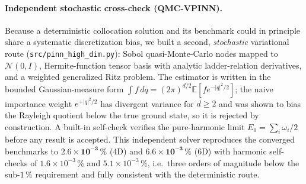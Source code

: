 \documentclass[11pt,a4paper]{article}
\begin{document}
\paragraph{Independent stochastic cross-check (QMC-VPINN).}
Because a deterministic collocation solution and its benchmark could in principle share
a systematic discretization bias, we built a second, \emph{stochastic} variational route
(\texttt{src/pinn\_high\_dim.py}): Sobol quasi-Monte-Carlo nodes mapped to $\mathcal{N}(0, I)$,
Hermite-function tensor basis with analytic ladder-relation derivatives, and a weighted
generalized Ritz problem. The estimator is written in the bounded Gaussian-measure form
$\int f\,dq = (2\pi)^{d/2}\mathbb{E}[f e^{-|q|^2/2}]$; the naive importance weight
$e^{+|q|^2/2}$ has divergent variance for $d \ge 2$ and was shown to bias the Rayleigh
quotient below the true ground state, so it is rejected by construction. A built-in
self-check verifies the pure-harmonic limit $E_0 = \sum_i \omega_i/2$ before any result is
accepted. This independent solver reproduces the converged benchmarks to
$\mathbf{2.6 \times 10^{-3}\,\%}$ (4D) and $\mathbf{6.6 \times 10^{-3}\,\%}$ (6D)
with harmonic self-checks of $1.6 \times 10^{-3}\,\%$ and $5.1 \times 10^{-3}\,\%$,
i.e.\ three orders of magnitude below the sub-$1\,\%$ requirement and fully consistent
with the deterministic route.
\end{document}
